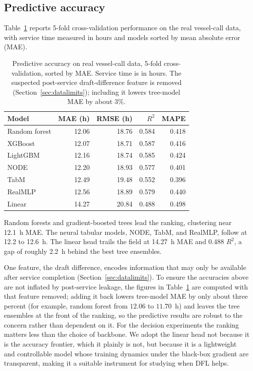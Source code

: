 \subsection{Predictive accuracy}

Table~\ref{tab:predictive} reports 5-fold cross-validation performance on the real vessel-call data, with service time measured in hours and models sorted by mean absolute error (MAE).

\begin{table}[t]
\centering
\caption{Predictive accuracy on real vessel-call data, 5-fold cross-validation, sorted by MAE. Service time is in hours. The suspected post-service draft-difference feature is removed (Section~\ref{sec:datalimits}); including it lowers tree-model MAE by about 3\%.}
\label{tab:predictive}
\begin{tabular}{lrrrr}
\toprule
Model & MAE (h) & RMSE (h) & $R^2$ & MAPE \\
\midrule
Random forest & 12.06 & 18.76 & 0.584 & 0.418 \\
XGBoost       & 12.07 & 18.71 & 0.587 & 0.416 \\
LightGBM      & 12.16 & 18.74 & 0.585 & 0.424 \\
NODE          & 12.20 & 18.93 & 0.577 & 0.401 \\
TabM          & 12.49 & 19.48 & 0.552 & 0.396 \\
RealMLP       & 12.56 & 18.89 & 0.579 & 0.440 \\
Linear        & 14.27 & 20.84 & 0.488 & 0.498 \\
\bottomrule
\end{tabular}
\end{table}

Random forests and gradient-boosted trees lead the ranking, clustering near 12.1~h MAE. The neural tabular models, NODE, TabM, and RealMLP, follow at 12.2 to 12.6~h. The linear head trails the field at 14.27~h MAE and 0.488 $R^2$, a gap of roughly 2.2~h behind the best tree ensembles.

One feature, the draft difference, encodes information that may only be available after service completion (Section~\ref{sec:datalimits}). To ensure the accuracies above are not inflated by post-service leakage, the figures in Table~\ref{tab:predictive} are computed with that feature removed; adding it back lowers tree-model MAE by only about three percent (for example, random forest from $12.06$ to $11.70$~h) and leaves the tree ensembles at the front of the ranking, so the predictive results are robust to the concern rather than dependent on it. For the decision experiments the ranking matters less than the choice of backbone. We adopt the linear head not because it is the accuracy frontier, which it plainly is not, but because it is a lightweight and controllable model whose training dynamics under the black-box gradient are transparent, making it a suitable instrument for studying when DFL helps.

